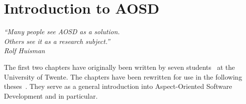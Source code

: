 \chapter{Introduction to AOSD}
\label{chp:AOSD}
\begin{flushright}
\textit{``Many people see AOSD as a solution.}\\
\textit{Others see it as a research subject.''}\\
\textit{Rolf Huisman}\\
\end{flushright}

The first two chapters have originally been written by seven \MSc students~\cite{Holljen2004, Durr2004, Vinkes2004, Bosman2004, Staijen2005, Havinga2005, Boschman2006} at the University of Twente.
The chapters have been rewritten for use in the following theses~\cite{VanOudheusden2006, Conradi2006, TeWinkel2006, Huttenhuis2006, Doornenbal2006, Huisman2006, SpenkelinkD2006, DeRoo2007, Hendriks2007}.
They serve as a general introduction into Aspect-Oriented Software Development and \Compose* in particular.




